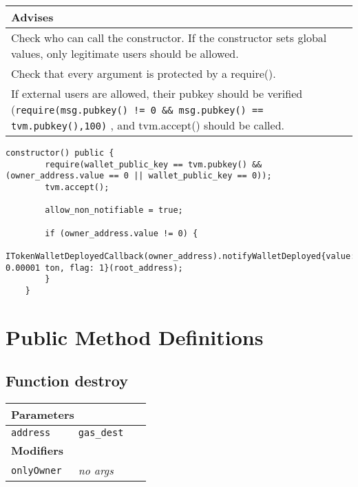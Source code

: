 
\ifsoldraft
\noindent\begin{tabular}{|p{12cm}|}\hline
\rowcolor{green}Advises
\\\hline
Check who can call the constructor. If the constructor sets global values, only legitimate users should be allowed.
\\\hline
Check that every argument is protected by a require().
\\\hline
If external users are allowed, their pubkey should be verified (\verb+require(msg.pubkey() != 0 && msg.pubkey() == tvm.pubkey(),100)+ , and tvm.accept() should be called.
\\\hline\end{tabular}
\fi
\vspace{2cm}

\begin{lstlisting}[firstnumber=43]
    constructor() public {
        require(wallet_public_key == tvm.pubkey() && (owner_address.value == 0 || wallet_public_key == 0));
        tvm.accept();

        allow_non_notifiable = true;

        if (owner_address.value != 0) {
            ITokenWalletDeployedCallback(owner_address).notifyWalletDeployed{value: 0.00001 ton, flag: 1}(root_address);
        }
    }
\end{lstlisting}

\section{Public Method Definitions}


\subsection{Function destroy}


\ifsoltables
\noindent\begin{tabular}{|l|l|p{5cm}|}\hline
\multicolumn{3}{|l|}{\bf Parameters}\\\hline
\tt address & \tt gas\_{}dest &\\\hline
\multicolumn{3}{|l|}{\bf Modifiers}\\\hline
\tt onlyOwner & {\em no args} &\\\hline
\end{tabular}
\fi


